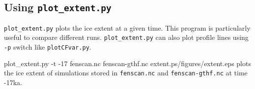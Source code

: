 \subsection{Using \texttt{plot\_extent.py}}
\texttt{plot\_extent.py} plots the ice extent at a given time. This program is particularly useful to compare different runs. \texttt{plot\_extent.py} can also plot profile lines using \texttt{-p} switch like \texttt{plotCFvar.py}.

\begin{pycf}{plot\_extent.py -t -17 fenscan.nc fenscan-gthf.nc extent.ps}{\dir/figures/extent.eps}
plots the ice extent of simulations stored in \texttt{fenscan.nc} and \texttt{fenscan-gthf.nc} at time -17ka.
\end{pycf}
